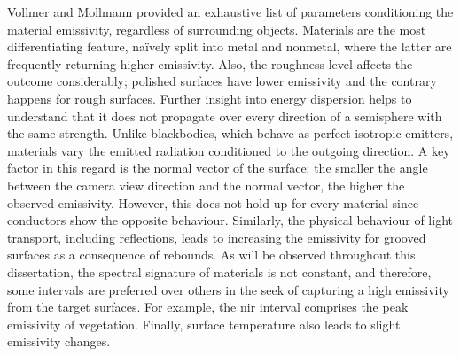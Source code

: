 Vollmer and Mollmann \cite{vollmer_infrared_2017} provided an exhaustive list of parameters conditioning the material emissivity, regardless of surrounding objects. Materials are the most differentiating feature, naïvely split into metal and nonmetal, where the latter are frequently returning higher emissivity. Also, the roughness level affects the outcome considerably; polished surfaces have lower emissivity and the contrary happens for rough surfaces. Further insight into energy dispersion helps to understand that it does not propagate over every direction of a semisphere with the same strength. Unlike blackbodies, which behave as perfect isotropic emitters, materials vary the emitted radiation conditioned to the outgoing direction. A key factor in this regard is the normal vector of the surface: the smaller the angle between the camera view direction and the normal vector, the higher the observed emissivity. However, this does not hold up for every material since conductors show the opposite behaviour. Similarly, the physical behaviour of light transport, including reflections, leads to increasing the emissivity for grooved surfaces as a consequence of rebounds. As will be observed throughout this dissertation, the spectral signature of materials is not constant, and therefore, some intervals are preferred over others in the seek of capturing a high emissivity from the target surfaces. For example, the \acrshort{nir} interval comprises the peak emissivity of vegetation. Finally, surface temperature also leads to slight emissivity changes.

